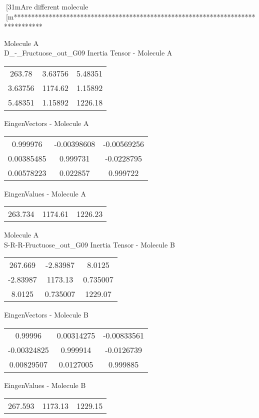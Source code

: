 [31mAre different molecule
[m********************************************************************************
\newpage
\begin{multicols}{2}
\begin{center}
Molecule A \\ 
D_-_Fructuose_out_G09
Inertia Tensor - Molecule A \\
\vtab
\begin{tabular}{|c c c|}
263.78	 & 	3.63756	 & 	5.48351	 \\
3.63756	 & 	1174.62	 & 	1.15892	 \\
5.48351	 & 	1.15892	 & 	1226.18
\end{tabular}

\vtab
 EingenVectors - Molecule A     \\
\vtab
\begin{tabular}{|c c c|}
0.999976	 & 	-0.00398608	 & 	-0.00569256	 \\
0.00385485	 & 	0.999731	 & 	-0.0228795	 \\
0.00578223	 & 	0.022857	 & 	0.999722
\end{tabular}

\vtab
 EingenValues - Molecule A     \\
\vtab
\begin{tabular}{|c c c|}
263.734	 & 	1174.61	 & 	1226.23
\end{tabular}
\columnbreak
Molecule A \\ 
S-R-R-Fructuose_out_G09
Inertia Tensor - Molecule B \\
\vtab
\begin{tabular}{|c c c|}
267.669	 & 	-2.83987	 & 	8.0125	 \\
-2.83987	 & 	1173.13	 & 	0.735007	 \\
8.0125	 & 	0.735007	 & 	1229.07
\end{tabular}

\vtab
 EingenVectors - Molecule B     \\
\vtab
\begin{tabular}{|c c c|}
0.99996	 & 	0.00314275	 & 	-0.00833561	 \\
-0.00324825	 & 	0.999914	 & 	-0.0126739	 \\
0.00829507	 & 	0.0127005	 & 	0.999885
\end{tabular}

\vtab
 EingenValues - Molecule B     \\
\vtab
\begin{tabular}{|c c c|}
267.593	 & 	1173.13	 & 	1229.15
\end{tabular}
\end{center}
\end{multicols}
